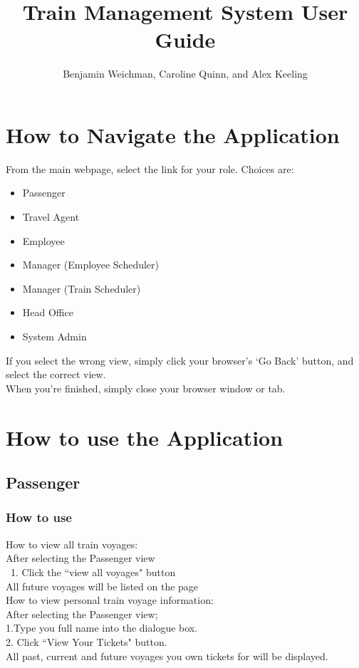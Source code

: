 \documentclass[letter]{article}
\title{Train Management System User Guide}
\author{Benjamin Weichman, Caroline Quinn, and Alex Keeling}
\date{}
\begin{document}
\maketitle

\section{How to Navigate the Application}
From the main webpage, select the link for your role. Choices are: 
\begin{itemize}
\item Passenger
\item Travel Agent
\item Employee
\item Manager (Employee Scheduler)
\item Manager (Train Scheduler)
\item Head Office
\item System Admin
\end{itemize}

If you select the wrong view, simply click your browser's `Go Back' button, and select the correct view. \\

When you're finished, simply close your browser window or tab.


\section{How to use the Application}

\subsection{Passenger}
\subsubsection{How to use}

How to view all train voyages:\\ 
After selecting the Passenger view \\\
1. Click the ``view all voyages" button\\
All future voyages will be listed on the page\\ 

How to view personal train voyage information:\\
After selecting the Passenger view;  \\
1.Type you full name into the dialogue box.\\
2. Click ``View Your Tickets" button.\\
All past, current and future voyages you own tickets for will be displayed. 
\end{document}
